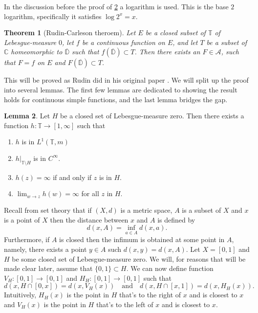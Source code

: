 \documentclass[a4paper,12pt,twoside,BCOR=10mm]{scrbook}
\newtheorem{theorem}{Theorem}[section]
\theoremstyle{definition}
\theoremstyle{definition}
\newtheorem{lemma}[theorem]{Lemma}
\theoremstyle{definition}
\begin{document}
In the discussion before the proof of \ref{mylemma} a logarithm is used.
This is the base $2$ logarithm, specifically it satisfies $\log 2^x = x$.

\begin{theorem}[Rudin-Carleson theroem]
\label{rudincarleson}
Let $E$ be a closed subset of $\mathbb{T}$ of Lebesgue-measure $0$,
	let $f$ be a continuous function on $E$,
	and let $T$ be a subset of $\mathbb{C}$ homeomorphic to $\overline{\mathbb{D}}$ such that $f(\overline{\mathbb{D}}) \subset T$.
Then there exists an $F \in \mathcal{A}$, such that $F = f$ on $E$ and $F(\overline{\mathbb{D}}) \subset T$.
\end{theorem}
This will be proved as Rudin did in his original paper \citep{rudin}.
We will split up the proof into several lemmas.
The first few lemmas are dedicated to showing the result holds for continuous simple functions, and the last lemma bridges the gap.
\begin{lemma}
\label{mylemma}
Let $H$ be a closed set of Lebesgue-measure zero.
Then there exists a function $h: \mathbb{T} \rightarrow [1, \infty]$ such that 
\begin{enumerate}
\item
$h$ is in $L^1(\mathbb{T}, m)$
\item
$h|_{\mathbb{T} \setminus H}$ is in $C^{\infty}$.
\item
$h(z) = \infty$ if and only if $z$ is in $H$.
\item
$\lim_{w \rightarrow z} h(w) = \infty$ for all $z$ in $H$.
\end{enumerate}
\end{lemma}
Recall from set theory that if $(X, d)$ is a metric space, $A$ is a subset of $X$ and $x$ is a point of $X$ then the distance between $x$ and $A$ is defined by
\[
	d(x, A) = \inf_{a \in A} d(x, a).
\]
Furthermore, if $A$ is closed then the infimum is obtained at some point in $A$, namely, there exists a point $y \in A$ such $d(x, y) = d(x, A)$.
Let $X = [0, 1]$ and $H$ be some closed set of Lebesgue-measure zero.
We will, for reasons that will be made clear later, assume that $\{0, 1\} \subset H$.
We can now define function $V_H: [0, 1] \rightarrow [0, 1]$ and $H_H: [0, 1] \rightarrow [0, 1]$ such that
\[
	d(x, H \cap [0, x]) = d(x, V_H(x))
	\quad \text{and} \quad
	d(x, H \cap [x, 1]) = d(x, H_H(x)).
\]
Intuitively, $H_H(x)$ is the point in $H$ that's to the right of $x$ and is closest to $x$ and $V_H(x)$ is the point in $H$ that's to the left of $x$ and is closest to $x$.
\end{document}

